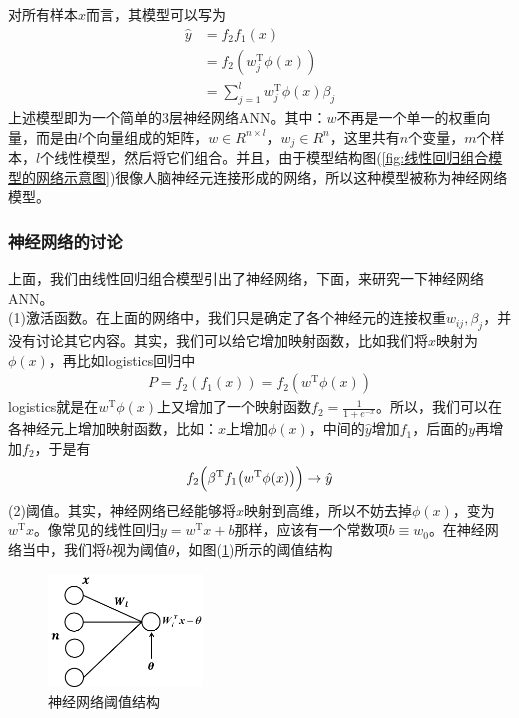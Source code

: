             \par
            对所有样本$x$而言，其模型可以写为
            \begin{align*}
            \hat{y} & = f_2f_1(x)\\
            & =f_2(w_j^\mathrm{T}\phi(x))\\
            & =\sum_{j=1}^l w_j^\mathrm{T}\phi(x)\beta_j
            \end{align*}
            上述模型即为一个简单的3层神经网络ANN。其中：$w$不再是一个单一的权重向量，而是由$l$个向量组成的矩阵，$w\in R^{n\times l}$，$w_j\in R^n$，这里共有$n$个变量，$m$个样本，$l$个线性模型，然后将它们组合。并且，由于模型结构图(\ref{fig:线性回归组合模型的网络示意图})很像人脑神经元连接形成的网络，所以这种模型被称为神经网络模型。

        \subsubsection{神经网络的讨论}
            \par
            上面，我们由线性回归组合模型引出了神经网络，下面，来研究一下神经网络ANN。\\
            (1)激活函数。在上面的网络中，我们只是确定了各个神经元的连接权重$w_{ij},\beta_j$，并没有讨论其它内容。其实，我们可以给它增加映射函数，比如我们将$x$映射为$\phi(x)$，再比如logistics回归中
            \begin{align*}
            P = f_2(f_1(x)) = f_2(w^\mathrm{T}\phi(x))
            \end{align*}
            logistics就是在$w^\mathrm{T}\phi(x)$上又增加了一个映射函数$f_2 = \frac{1}{1+e^{-x}}$。所以，我们可以在各神经元上增加映射函数，比如：$x$上增加$\phi(x)$，中间的$\hat{y}$增加$f_1$，后面的$y$再增加$f_2$，于是有
            \begin{align*}
            f_2\Bigl(\beta^\mathrm{T}f_1\big(w^\mathrm{T}\phi(x)\big)\Bigr) \rightarrow \hat{y}
            \end{align*}
            (2)阈值。其实，神经网络已经能够将$x$映射到高维，所以不妨去掉$\phi(x)$，变为$w^\mathrm{T}x$。像常见的线性回归$y=w^\mathrm{T}x + b$那样，应该有一个常数项$b \equiv w_0$。在神经网络当中，我们将$b$视为阈值$\theta$，如图(\ref{fig:神经网络阈值结构})所示的阈值结构
            \begin{figure}[H]
            \centering
            \includegraphics[height=3cm]{images/neural_network_structure.jpg}
            \caption{神经网络阈值结构}
            \label{fig:神经网络阈值结构}
            \end{figure}
